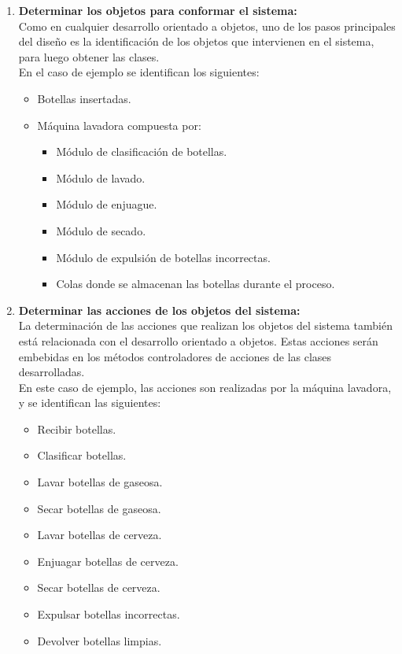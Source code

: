 \begin{enumerate}
\item \textbf{Determinar los objetos para conformar el sistema:}\\
        Como en cualquier desarrollo orientado a objetos, uno de los pasos principales
        del diseño es la identificación de los objetos que intervienen en el sistema,
        para luego obtener las clases. \\
        En el caso de ejemplo se identifican los siguientes:
            \begin{itemize}
              \item Botellas insertadas.
              \item Máquina lavadora compuesta por:
              \begin{itemize}
                  \item Módulo de clasificación de botellas.
                  \item Módulo de lavado.
                  \item Módulo de enjuague.
                  \item Módulo de secado.
                  \item Módulo de expulsión de botellas incorrectas.
                  \item Colas donde se almacenan las botellas durante el proceso.
              \end{itemize}
            \end{itemize}

\item \textbf{Determinar las acciones de los objetos del sistema:}\\
            La determinación de las acciones que realizan los objetos del
            sistema también está relacionada con el desarrollo orientado a
            objetos. Estas acciones serán embebidas en los métodos
            controladores de acciones de las clases desarrolladas. \\
            En este caso de ejemplo, las acciones son realizadas por la máquina
            lavadora, y se identifican las siguientes:
            \begin{itemize}
              \item Recibir botellas.
              \item Clasificar botellas.
              \item Lavar botellas de gaseosa.
              \item Secar botellas de gaseosa.
              \item Lavar botellas de cerveza.
              \item Enjuagar botellas de cerveza.
              \item Secar botellas de cerveza.
              \item Expulsar botellas incorrectas.
              \item Devolver botellas limpias.
            \end{itemize}


\end{enumerate}
